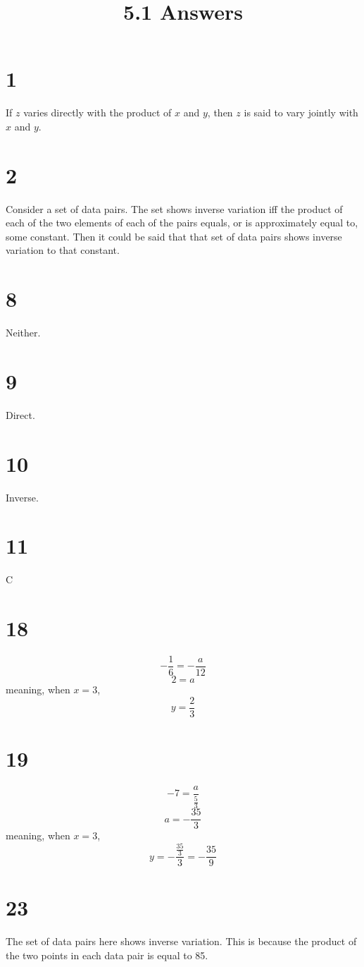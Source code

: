 \documentclass{article}
\title{5.1 Answers}
\theoremstyle{definition}
\newcommand{\?}{\stackrel{?}{=}}
\begin{document}
\maketitle

\section*{1}
If $z$ varies directly with the product of $x$ and $y$, then $z$ is said to vary jointly with $x$ and $y$.

\section*{2}
Consider a set of data pairs. The set shows inverse variation iff the product of each of the two elements of each of the pairs equals, or is approximately equal to, some constant. 
Then it could be said that that set of data pairs shows inverse variation to that constant.

\section*{8}
Neither.

\section*{9}
Direct.

\section*{10}
Inverse.

\section*{11}
C

\section*{18}
\[ -\frac{1}{6}=-\frac{a}{12} \] \[ 2=a \] meaning, when $x=3$, \[ y=\frac{2}{3} \]

\section*{19}
\[ -7=\frac{a}{\frac{5}{3}} \] \[ a=-\frac{35}{3} \] meaning, when $x=3$, \[ y=-\frac{\frac{35}{3}}{3}=-\frac{35}{9} \]

\section*{23}
The set of data pairs here shows inverse variation. This is because the product of the two points in each data pair is equal to 85. 
\end{document}
